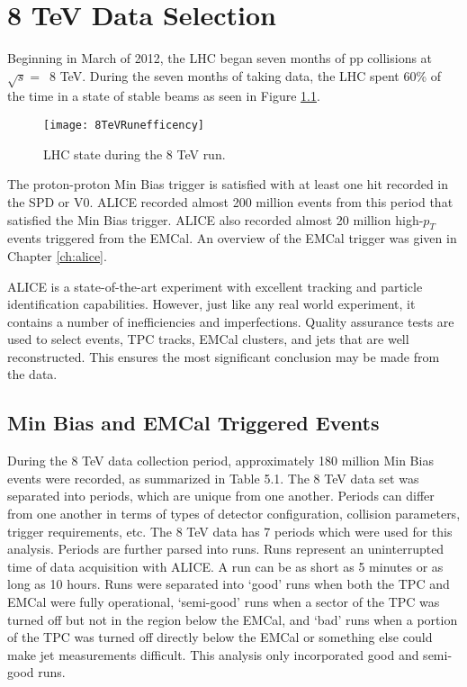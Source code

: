 \chapter{8 TeV Data Selection} \label{ch:data}

Beginning in March of 2012, the LHC began seven months of pp collisions at $\sqrt{s} = \,$ 8 TeV. During the seven months of taking data, the LHC spent 60\% of the time in a state of stable beams as seen in Figure \ref{fig:RunEffer}.

\begin{figure}[b!]
\texttt{[image: 8TeVRunefficency]}
\centering
\caption{LHC state during the 8 TeV run. }
\label{fig:RunEffer}
\end{figure}


The proton-proton Min Bias trigger is satisfied with at least one hit recorded in the SPD or V0.  ALICE recorded almost 200 million events from this period that satisfied the Min Bias trigger.  ALICE also recorded almost 20 million high-$p_{T}$ events triggered from the EMCal.  An overview of the EMCal trigger was given in Chapter \ref{ch:alice}.

ALICE is a state-of-the-art experiment with excellent tracking and particle identification capabilities.  However, just like any real world experiment, it contains a number of inefficiencies and imperfections.  Quality assurance tests are used to select events, TPC tracks, EMCal clusters, and jets that are well reconstructed.  This ensures the most significant conclusion may be made from the data.

\section{Min Bias and EMCal Triggered Events}

During the 8 TeV data collection period, approximately 180 million Min Bias events were recorded, as summarized in Table 5.1.  The 8 TeV data set was separated into periods, which are unique from one another.  Periods can differ from one another in terms of types of detector configuration, collision parameters, trigger requirements, etc.  The 8 TeV data has 7 periods which were used for this analysis.  Periods are further parsed into runs.  Runs represent an uninterrupted time of data acquisition with ALICE. A run can be as short as 5 minutes or as long as 10 hours.  Runs were separated into `good' runs when both the TPC and EMCal were fully operational, `semi-good' runs when a sector of the TPC was turned off but not in the region below the EMCal, and `bad' runs when a portion of the TPC was turned off directly below the EMCal or something else could make jet measurements difficult.  This analysis only incorporated good and semi-good runs.

